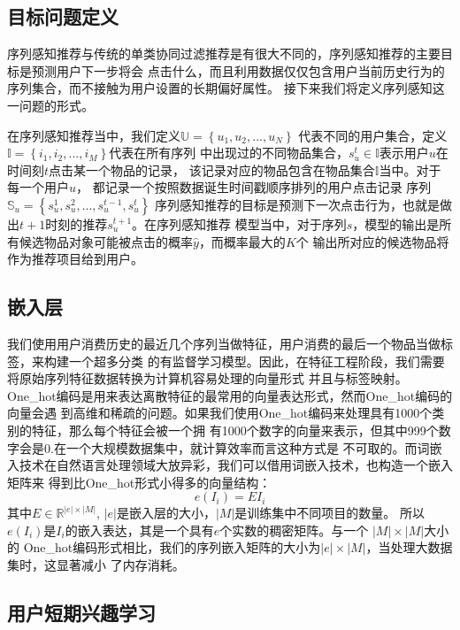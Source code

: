 \subsection{目标问题定义}

序列感知推荐与传统的单类协同过滤推荐是有很大不同的，序列感知推荐的主要目标是预测用户下一步将会%
点击什么，而且利用数据仅仅包含用户当前历史行为的序列集合，而不接触为用户设置的长期偏好属性。%
接下来我们将定义序列感知这一问题的形式。%

在序列感知推荐当中，我们定义$\mathbb{U}= \left \{ u_{1},u_{2},...,u_{N} \right \}\label{eq}$%
代表不同的用户集合，定义$\mathbb{I}= \left \{ i_{1},i_{2},...,i_{M} \right \}$代表在所有序列%
中出现过的不同物品集合，$s_{u}^{t}\in \mathbb{I}$表示用户$u$在时间刻$t$点击某一个物品的记录，%
该记录对应的物品包含在物品集合$\mathbb{I}$当中。对于每一个用户$u$，%
都记录一个按照数据诞生时间戳顺序排列的用户点击记录%
序列$\mathbb{S}_{u}=\left \{ s_{u}^{1},s_{u}^{2},...,s_{u}^{t-1},s_{u}^{t} \right \}$%
序列感知推荐的目标是预测下一次点击行为，也就是做出$t+1$时刻的推荐$s_{u}^{t+1}$。在序列感知推荐%
模型当中，对于序列$s$，模型的输出是所有候选物品对象可能被点击的概率$\hat{y}$，而概率最大的$K$个%
输出所对应的候选物品将作为推荐项目给到用户。%
%
%
%
%

\subsection{嵌入层}

我们使用用户消费历史的最近几个序列当做特征，用户消费的最后一个物品当做标签，来构建一个超多分类%
的有监督学习模型。因此，在特征工程阶段，我们需要将原始序列特征数据转换为计算机容易处理的向量形式%
并且与标签映射。One\_hot编码是用来表达离散特征的最常用的向量表达形式，然而One\_hot编码的向量会遇%
到高维和稀疏的问题。如果我们使用One\_hot编码来处理具有1000个类别的特征，那么每个特征会被一个拥%
有1000个数字的向量来表示，但其中999个数字会是0.在一个大规模数据集中，就计算效率而言这种方式是%
不可取的。而词嵌入技术在自然语言处理领域大放异彩，我们可以借用词嵌入技术，也构造一个嵌入矩阵来%
得到比One\_hot形式小得多的向量结构：
$$
e(I_i) = EI_i
$$
其中$E\in \mathbb{R}^{|e|\times |M|}$, $|e|$是嵌入层的大小，$|M|$是训练集中不同项目的数量。%
所以$e(I_i)$是$I_i$的嵌入表达，其是一个具有$e$个实数的稠密矩阵。与一个 $|M|\times |M|$大小的%
One\_hot编码形式相比，我们的序列嵌入矩阵的大小为$|e|\times |M|$，当处理大数据集时，这显著减小%
了内存消耗。

\subsection{用户短期兴趣学习}

